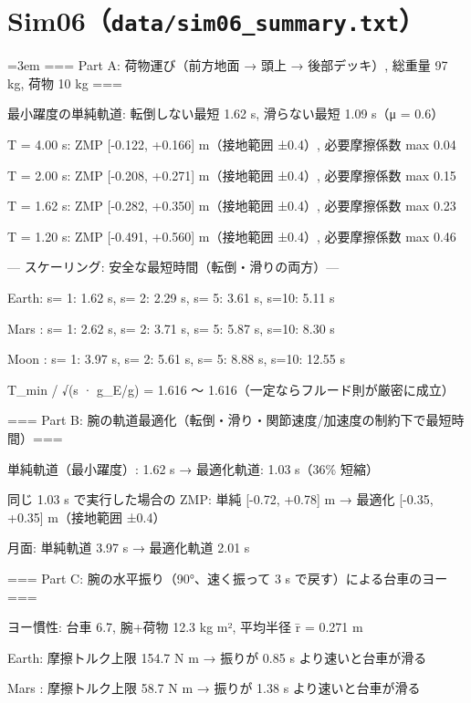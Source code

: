 \section{Sim06（\texttt{data/sim06\_summary.txt}）}
{\footnotesize\raggedright\sloppy\setlength{\parindent}{0pt}\setlength{\parskip}{0pt}\emergencystretch=3em
=== Part A: 荷物運び（前方地面 → 頭上 → 後部デッキ）, 総重量 97 kg, 荷物 10 kg ===\par
最小躍度の単純軌道: 転倒しない最短 1.62 s, 滑らない最短 1.09 s（μ = 0.6）\par
  T = 4.00 s: ZMP [-0.122, +0.166] m（接地範囲 ±0.4）, 必要摩擦係数 max 0.04\par
  T = 2.00 s: ZMP [-0.208, +0.271] m（接地範囲 ±0.4）, 必要摩擦係数 max 0.15\par
  T = 1.62 s: ZMP [-0.282, +0.350] m（接地範囲 ±0.4）, 必要摩擦係数 max 0.23\par
  T = 1.20 s: ZMP [-0.491, +0.560] m（接地範囲 ±0.4）, 必要摩擦係数 max 0.46\par
\mbox{}\par
--- スケーリング: 安全な最短時間（転倒・滑りの両方）---\par
Earth: s= 1:  1.62 s, s= 2:  2.29 s, s= 5:  3.61 s, s=10:  5.11 s\par
Mars : s= 1:  2.62 s, s= 2:  3.71 s, s= 5:  5.87 s, s=10:  8.30 s\par
Moon : s= 1:  3.97 s, s= 2:  5.61 s, s= 5:  8.88 s, s=10: 12.55 s\par
T\_min / √(s · g\_E/g) = 1.616 〜 1.616（一定ならフルード則が厳密に成立）\par
\mbox{}\par
=== Part B: 腕の軌道最適化（転倒・滑り・関節速度/加速度の制約下で最短時間）===\par
単純軌道（最小躍度）: 1.62 s → 最適化軌道: 1.03 s（36\% 短縮）\par
同じ 1.03 s で実行した場合の ZMP: 単純 [-0.72, +0.78] m → 最適化 [-0.35, +0.35] m（接地範囲 ±0.4）\par
月面: 単純軌道 3.97 s → 最適化軌道 2.01 s\par
\mbox{}\par
=== Part C: 腕の水平振り（90°、速く振って 3 s で戻す）による台車のヨー ===\par
ヨー慣性: 台車 6.7, 腕+荷物 12.3 kg m², 平均半径 r̄ = 0.271 m\par
  Earth: 摩擦トルク上限  154.7 N m → 振りが 0.85 s より速いと台車が滑る\par
  Mars : 摩擦トルク上限   58.7 N m → 振りが 1.38 s より速いと台車が滑る\par
}
